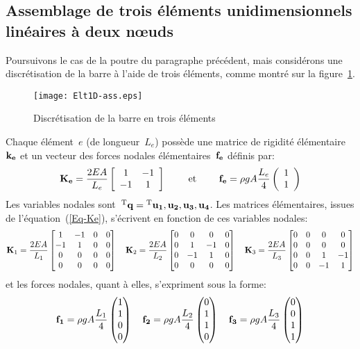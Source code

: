\medskip
\subsection{Assemblage de trois éléments unidimensionnels linéaires à deux nœuds}\label{Sec-ass}

Poursuivons le cas de la poutre du paragraphe précédent, mais considérons une discrétisation de la barre à l'aide de trois éléments, comme montré sur la figure~\ref{fig-ex2ass}.
\begin{figure}[h!]\centering
\texttt{[image: Elt1D-ass.eps]}
\caption{Discrétisation de la barre en trois éléments}\label{fig-ex2ass}
\end{figure}
\medskipvm
Chaque élément~$e$ (de longueur~$L_e$) possède une matrice de rigidité élémentaire~$\MM{k_e}$ et un vecteur des forces nodales élémentaires~$\VV{f_e}$ définis par:
\begin{equation}\label{Eq-Ke}
\MM{K_e} = \frac{2EA}{L_e} \MM*{\begin{array}{cc} 1 & -1\\ -1& 1 \end{array}}
\qquad \text{ et } \qquad
\VV{f_e} = \rho g A \frac{L_e}4 \VV*{\begin{array}{c} 1 \\1 \end{array}}
\end{equation}
\medskipvm
Les variables nodales sont~${}^\mathrm{T}\mathbf{q}={}^\mathrm{T}\mathbf{u_1, u_2, u_3, u_4}$. Les matrices élémentaires,
issues de l'équation~(\ref{Eq-Ke}), s'écrivent en fonction de ces variables nodales:
\begin{equation*}
\MM{K}_1 = \frac{2EA}{L_1} \MM*{1 & -1 & 0 & 0\\ -1& 1 & 0 & 0\\ 0&0&0&0\\0&0&0&0}
\quad
\MM{K}_2 = \frac{2EA}{L_2} \MM*{0&0&0&0\\ 0& 1 & -1 & 0\\ 0 & -1& 1& 0\\0&0&0&0}
\quad
\MM{K}_3 = \frac{2EA}{L_3} \MM*{0&0&0&0\\0&0&0&0\\0& 0& 1 & -1\\ 0&0 & -1& 1}
\end{equation*}
et les forces nodales, quant à elles, s'expriment sous la forme:
\begin{equation*}
\VV{f_1} = \rho g A \frac{L_1}4 \VV*{1 \\1\\0\\0}
\quad
\VV{f_2} = \rho g A \frac{L_2}4 \VV*{0\\1 \\1\\0}
\quad
\VV{f_3} = \rho g A \frac{L_3}4 \VV*{0\\0\\1 \\1}
\end{equation*}
